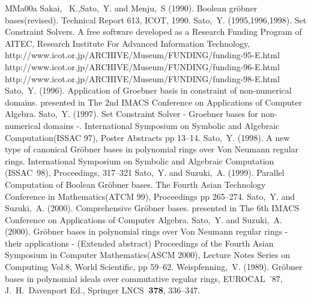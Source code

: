 \documentclass[12pt,a4paper]{article}
\begin{document}
\begin{thebibliography}{MMa00a}
        Sakai, ~K.,Sato,~Y. and Menju,~S (1990). Boolean gr\"obner bases(revised).
        Technical Report 613, ICOT, 1990.
        Sato,~Y. (1995,1996,1998). Set Constraint Solvers. A free software developed as
        a Research Funding Program of AITEC, Research Institute For Advanced
        Information Technology, \\
        http://www.icot.or.jp/ARCHIVE/Museum/FUNDING/funding-95-E.html\\
        http://www.icot.or.jp/ARCHIVE/Museum/FUNDING/funding-96-E.html\\
        http://www.icot.or.jp/ARCHIVE/Museum/FUNDING/funding-98-E.html\\
        Sato,~Y. (1996). Application of Groebner basis in constraint of non-numerical domains.
        presented in The 2nd IMACS Conference on Applications of Computer Algebra.
        Sato,~Y. (1997). Set Constraint Solver 
        - Groebner bases for non-numerical domains -.
        International Symposium on Symbolic and Algebraic Computation(ISSAC 97), 
        Poster Abstracts pp 13--14.
	Sato,~Y. (1998). A new type of canonical Gr\"obner bases
	in polynomial rings over Von Neumann regular rings.
	International Symposium on Symbolic and Algebraic
	Computation (ISSAC~98), Proceedings, 317--321
        Sato,~Y. and Suzuki,~A.
        (1999). Parallel Computation of Boolean Gr\"{o}bner bases.
        The Fourth Asian Technology Conference in Mathematics(ATCM 99),
        Proceedings pp 265--274.
        Sato,~Y. and Suzuki,~A.
        (2000). Comprehensive Gr\"{o}bner bases.
        presented in The 6th IMACS Conference on Applications of Computer Algebra.
        Sato,~Y. and Suzuki,~A.
        (2000). Gr\"{o}bner bases in polynomial rings over Von Neumann regular rings - their applications - (Extended abstract)
        Proceedings of the Fourth Asian Symposium in Computer Mathematics(ASCM 2000),
        Lecture Notes Series on Computimg Vol.8, World Scientific, pp 59--62.
	Weispfenning,~V. (1989). Gr\"obner bases in polynomial
	ideals over commutative regular rings,
	EUROCAL~'87, J.~H.~Davenport Ed., 
	Springer LNCS{\bf~378}, 336--347.
\end{thebibliography}
\end{document}

